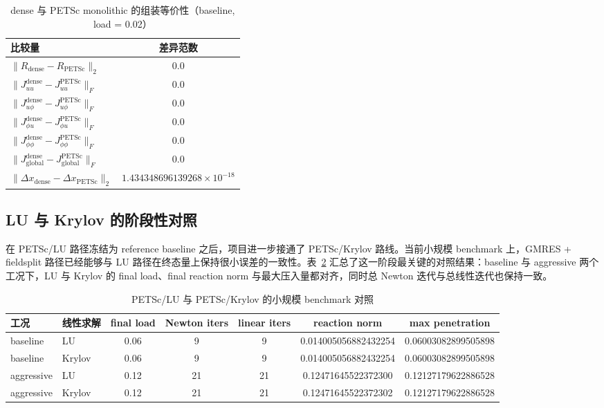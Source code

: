 \documentclass[12pt,a4paper]{ctexart}
\numberwithin{equation}{section}
\begin{document}
\begin{table}[H]
\centering
\caption{dense 与 PETSc monolithic 的组装等价性（baseline, load = 0.02）}
\label{tab:dense-vs-petsc-equivalence}
\small
\begin{tabular}{lc}
\toprule
比较量 & 差异范数 \\
\midrule
$\|R_{\mathrm{dense}} - R_{\mathrm{PETSc}}\|_2$ & 0.0 \\
$\|J_{uu}^{\mathrm{dense}} - J_{uu}^{\mathrm{PETSc}}\|_F$ & 0.0 \\
$\|J_{u\phi}^{\mathrm{dense}} - J_{u\phi}^{\mathrm{PETSc}}\|_F$ & 0.0 \\
$\|J_{\phi u}^{\mathrm{dense}} - J_{\phi u}^{\mathrm{PETSc}}\|_F$ & 0.0 \\
$\|J_{\phi\phi}^{\mathrm{dense}} - J_{\phi\phi}^{\mathrm{PETSc}}\|_F$ & 0.0 \\
$\|J_{\mathrm{global}}^{\mathrm{dense}} - J_{\mathrm{global}}^{\mathrm{PETSc}}\|_F$ & 0.0 \\
$\|\Delta x_{\mathrm{dense}} - \Delta x_{\mathrm{PETSc}}\|_2$ & $1.434348696139268\times 10^{-18}$ \\
\bottomrule
\end{tabular}
\end{table}

\subsection{LU 与 Krylov 的阶段性对照}

在 PETSc/LU 路径冻结为 reference baseline 之后，项目进一步接通了 PETSc/Krylov 路线。当前小规模 benchmark 上，GMRES + fieldsplit 路径已经能够与 LU 路径在终态量上保持很小误差的一致性。表~\ref{tab:lu-vs-krylov} 汇总了这一阶段最关键的对照结果：baseline 与 aggressive 两个工况下，LU 与 Krylov 的 final load、final reaction norm 与最大压入量都对齐，同时总 Newton 迭代与总线性迭代也保持一致。

\begin{table}[H]
\centering
\caption{PETSc/LU 与 PETSc/Krylov 的小规模 benchmark 对照}
\label{tab:lu-vs-krylov}
\small
\begin{tabular}{llccccc}
\toprule
工况 & 线性求解 & final load & Newton iters & linear iters & reaction norm & max penetration \\
\midrule
baseline & LU & 0.06 & 9 & 9 & 0.014005056882432254 & 0.06003082899505898 \\
baseline & Krylov & 0.06 & 9 & 9 & 0.014005056882432254 & 0.06003082899505898 \\
\midrule
aggressive & LU & 0.12 & 21 & 21 & 0.12471645522372300 & 0.12127179622886528 \\
aggressive & Krylov & 0.12 & 21 & 21 & 0.12471645522372302 & 0.12127179622886528 \\
\bottomrule
\end{tabular}
\end{table}
\end{document}
